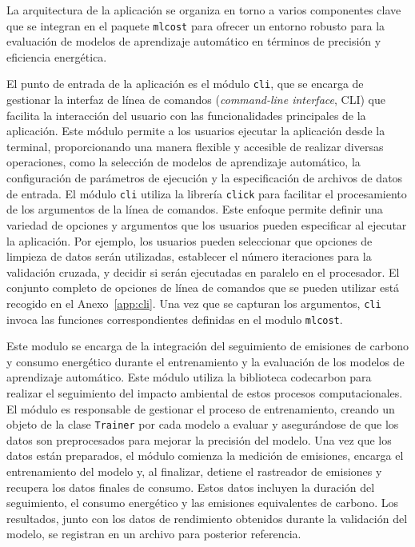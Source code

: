 La arquitectura de la aplicación se organiza en torno a varios componentes clave que se integran en el paquete \texttt{mlcost} para ofrecer un entorno robusto para la evaluación de modelos de aprendizaje automático en términos de precisión y eficiencia energética. 

El punto de entrada de la aplicación es el módulo \texttt{cli}, que se encarga de gestionar la interfaz de línea de comandos (\emph{command-line interface}, CLI) que facilita la interacción del usuario con las funcionalidades principales de la aplicación. Este módulo permite a los usuarios ejecutar la aplicación desde la terminal, proporcionando una manera flexible y accesible de realizar diversas operaciones, como la selección de modelos de aprendizaje automático, la configuración de parámetros de ejecución y la especificación de archivos de datos de entrada. El módulo \texttt{cli} utiliza la librería \texttt{click} para facilitar el procesamiento de los argumentos de la línea de comandos. Este enfoque permite definir una variedad de opciones y argumentos que los usuarios pueden especificar al ejecutar la aplicación. Por ejemplo, los usuarios pueden seleccionar que opciones de limpieza de datos serán utilizadas, establecer el número iteraciones para la validación cruzada, y decidir si serán ejecutadas en paralelo en el procesador. El conjunto completo de opciones de línea de comandos que se pueden utilizar está recogido en el Anexo~\ref{app:cli}. Una vez que se capturan los argumentos, \texttt{cli} invoca las funciones correspondientes definidas en el modulo \texttt{mlcost}.

Este modulo se encarga de la integración del seguimiento de emisiones de carbono y consumo energético durante el entrenamiento y la evaluación de los modelos de aprendizaje automático. Este módulo utiliza la biblioteca codecarbon para realizar el seguimiento del impacto ambiental de estos procesos computacionales. El módulo es responsable de gestionar el proceso de entrenamiento, creando un objeto de la clase \texttt{Trainer} por cada modelo a evaluar y asegurándose de que los datos son preprocesados para mejorar la precisión del modelo. Una vez que los datos están preparados, el módulo comienza la medición de emisiones, encarga el entrenamiento del modelo y, al finalizar, detiene el rastreador de emisiones y recupera los datos finales de consumo. Estos datos incluyen la duración del seguimiento, el consumo energético y las emisiones equivalentes de carbono. Los resultados, junto con los datos de rendimiento obtenidos durante la validación del modelo, se registran en un archivo para posterior referencia.

